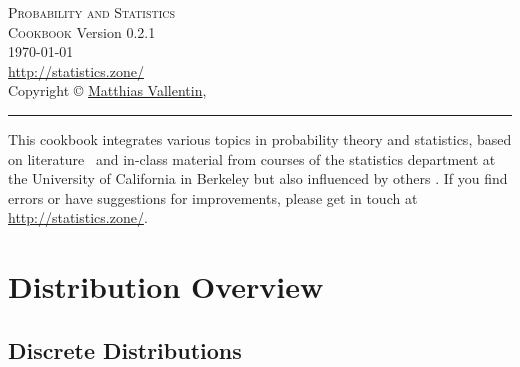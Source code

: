 \documentclass[landscape]{article}
\newcommand{\version}{0.2.1}
\def\web{\url{http://statistics.zone/}}
\begin{document}
\thispagestyle{empty}
\begin{center}
  \vspace*{\fill}
  \textsc{\Huge Probability and Statistics\\[2ex] \huge Cookbook}
  \vfill
  \footnotesize{
    Version \version\\[1ex]
    \today\\[1ex]
    \web\\[1ex]
    Copyright \copyright{}
    \href{http://matthias.vallentin.net}{Matthias Vallentin}, \number\year\\
  }
\end{center}

\newpage

\thispagestyle{empty}
\begin{multicols*}{3}
  \tableofcontents
  \vfill
  \hrule
  \vspace{5pt}
  {\footnotesize This cookbook integrates various topics in probability theory
  and statistics, based on literature~\cite{Hoel72,Wasserman03,Shumway06}
  and in-class material from courses of the statistics department at the
  University of California in Berkeley but also influenced by others
  \cite{Steger01,Steger02}. If you find errors or have suggestions for
  improvements, please get in touch at \web.}
\end{multicols*}

\newpage

\section{Distribution Overview}

\subsection{Discrete Distributions}
\end{document}
